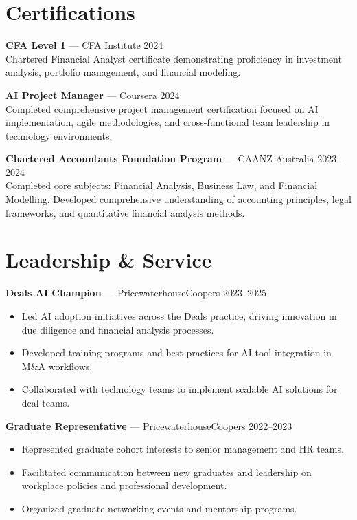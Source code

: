 \documentclass[10pt,letterpaper]{article}
\begin{document}
\section*{Certifications}

\textbf{CFA Level 1} — CFA Institute \hfill 2024\\
Chartered Financial Analyst certificate demonstrating proficiency in investment analysis, portfolio management, and financial modeling.

\textbf{AI Project Manager} — Coursera \hfill 2024\\
Completed comprehensive project management certification focused on AI implementation, agile methodologies, and cross-functional team leadership in technology environments.

\textbf{Chartered Accountants Foundation Program} — CAANZ Australia \hfill 2023--2024\\
Completed core subjects: Financial Analysis, Business Law, and Financial Modelling. Developed comprehensive understanding of accounting principles, legal frameworks, and quantitative financial analysis methods.


\section*{Leadership \& Service}

\textbf{Deals AI Champion} — PricewaterhouseCoopers \hfill 2023--2025\\[-1.1em]
\begin{itemize}
  \item Led AI adoption initiatives across the Deals practice, driving innovation in due diligence and financial analysis processes.
  \item Developed training programs and best practices for AI tool integration in M\&A workflows.
  \item Collaborated with technology teams to implement scalable AI solutions for deal teams.
\end{itemize}

\clearpage
\textbf{Graduate Representative} — PricewaterhouseCoopers \hfill 2022--2023\\[-1.1em]
\begin{itemize}
  \item Represented graduate cohort interests to senior management and HR teams.
  \item Facilitated communication between new graduates and leadership on workplace policies and professional development.
  \item Organized graduate networking events and mentorship programs.
\end{itemize}
\end{document}
